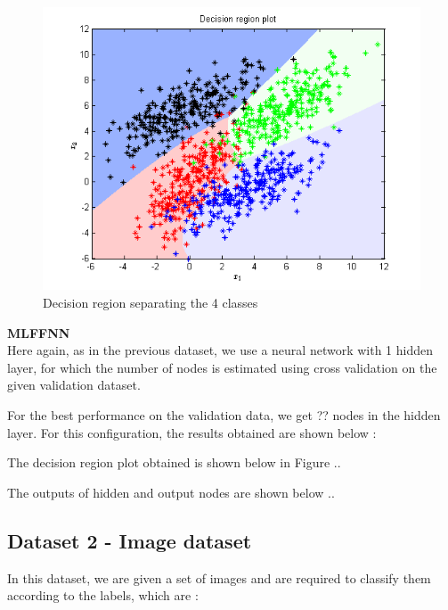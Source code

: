 \documentclass{article}
\begin{document}
\begin{figure}[H]
\centering
\includegraphics[width=\linewidth]{Classification/overlapping/decn_region_bayes.png}
\caption{Decision region separating the 4 classes}
\end{figure}



\begin{flushleft}
\textbf{MLFFNN} \\[10pt]
Here again, as in the previous dataset, we use a neural network with 1 hidden layer, for which the number of nodes is estimated using cross validation on the given validation dataset.

For the best performance on the validation data, we get ?? nodes in the hidden layer. For this configuration, the results obtained are shown below :

\end{flushleft}

\begin{flushleft}
The decision region plot obtained is shown below in Figure ..

The outputs of hidden and output nodes are shown below ..

\end{flushleft}





\subsection{Dataset 2 - Image dataset}
In this dataset, we are given a set of images and are required to classify them according to the labels, which are  :
\end{document}
